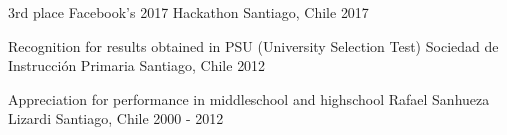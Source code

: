 
\begin{cvhonors}

  \cvhonor
    {3rd place} %
    {Facebook's 2017 Hackathon} %
    {Santiago, Chile} %
    {2017} %

  \cvhonor
    {Recognition for results obtained in PSU (University Selection Test)} %
    {Sociedad de Instrucción Primaria}
    {Santiago, Chile} %
    {2012} %

  \cvhonor
    {Appreciation for performance in middleschool and highschool} %
    {Rafael Sanhueza Lizardi}
    {Santiago, Chile} %
    {2000 - 2012} %
\end{cvhonors}
